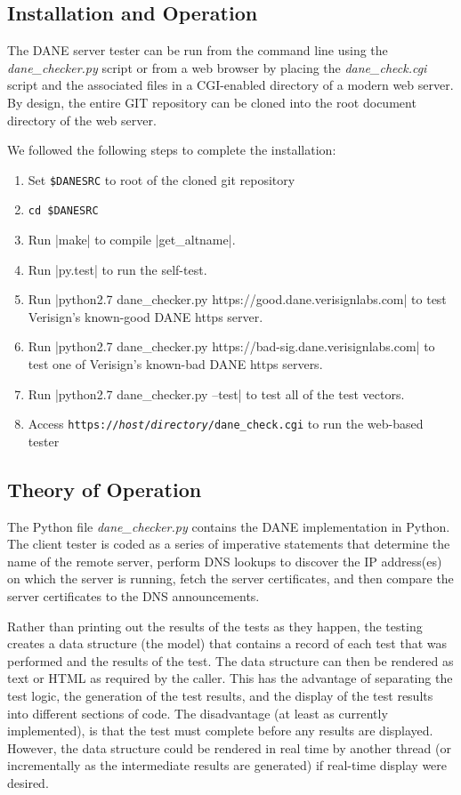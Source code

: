 \documentclass[preprint,3p,11pt]{elsarticle}
\begin{document}
\subsection{Installation and Operation}

The DANE server tester can be run from the command line using the
\emph{dane\_checker.py} script or from a web browser by placing the
\emph{dane\_check.cgi} script and the associated files in a
CGI-enabled directory of a modern web server. By design, the entire
GIT repository can be cloned into the root document directory of the web server.

We followed the following steps to complete the installation:

\begin{enumerate}
\item Set \verb|$DANESRC| to root of the cloned git repository
\item \verb|cd $DANESRC|
\item Run |make| to compile |get_altname|.
\item Run |py.test| to run the self-test.
\item Run |python2.7 dane_checker.py https://good.dane.verisignlabs.com| to test Verisign's known-good
  DANE https server.
\item Run |python2.7 dane_checker.py https://bad-sig.dane.verisignlabs.com| to test one of Verisign's
  known-bad DANE https servers.
\item Run |python2.7 dane_checker.py --test| to test all of the test vectors.
\item Access \texttt{https://\emph{host}/\emph{directory}/dane\_check.cgi} to run
  the web-based tester
\end{enumerate}


\subsection{Theory of Operation}

The Python file \emph{dane\_checker.py} contains the
DANE implementation in Python. The client tester is coded as a series of
imperative statements that determine the name of the remote server,
perform DNS lookups to discover the IP address(es) on which the server
is running, fetch the server certificates, and then compare the server
certificates to the DNS announcements. 

Rather than printing out the results of the tests as they happen, the
testing  creates a data structure (the model) that contains a record
of each test that was performed and the results of the test. The
data structure can then be rendered as text or HTML as required by the
caller. This has the advantage of separating the test logic, the
generation of the test results, and the display of the test results
into different sections of code. The disadvantage (at least as
currently implemented), is that the test must complete before any
results are displayed. However, the data structure could be rendered
in real time by another thread (or incrementally as the intermediate
results are generated) if real-time display were desired.
\end{document}
